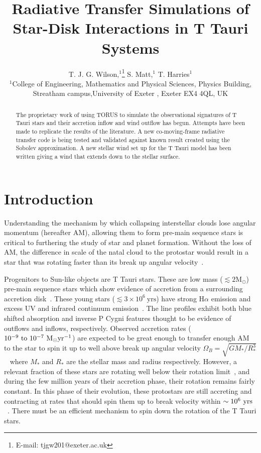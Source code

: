\documentclass[fleqn,usenatbib]{mnras}
\title[Radiative Transfer of Star-Disk Interactions]{Radiative Transfer Simulations of Star-Disk Interactions in T Tauri Systems}
\author[T. J. G. Wilson et al.]{
T. J. G. Wilson,$^{1}$\thanks{E-mail: tjgw201@exeter.ac.uk}
S. Matt,$^{1}$
T. Harries$^{1}$
\\
$^{1}$College of Engineering, Mathematics and Physical Sciences, Physics Building, Streatham campus,University of Exeter , Exeter EX4 4QL, UK\\
}
\begin{document}
\label{firstpage}
\pagerange{\pageref{firstpage}--\pageref{lastpage}}
\maketitle
\begin{abstract}
\noindent The proprietary work of using TORUS to simulate the observational signatures of T Tauri stars and their accretion inflow and wind outflow has begun. Attempts have been made to replicate the results of the literature. A new co-moving-frame radiative transfer code is being tested and validated against known result created using the Sobolev approximation. A new stellar wind set up for the T Tauri model has been written giving a wind that extends down to the stellar surface.
\end{abstract}



\section{Introduction}
\label{sec:introduction}
Understanding the mechanism by which collapsing interstellar clouds lose angular momentum (hereafter AM), allowing them to form pre-main sequence stars is critical to furthering the study of star and planet formation. Without the loss of AM, the difference in scale of the natal cloud to the protostar would result in a star that was rotating faster than its break up angular velocity~\citep{Hartmann:2016gu}. 


Progenitors to Sun-like objects are T Tauri stars. These are low mass ($\lesssim 2 \textrm{M}_\odot$) pre-main sequence stars which show evidence of accretion from a surrounding accretion disk~\citep{1998ApJ...495..385H}. These young stars ($\lesssim3\times10^{6}~\textrm{yrs}$) have strong H$\alpha$ emission and excess UV and infrared continuum emission~\citep{2005MNRAS.358..671K}. The line profiles exhibit both blue shifted absorption and inverse P Cygni features thought to be evidence of outflows and inflows, respectively. Observed accretion rates ($10^{-9}~\textrm{to}~10^{-7}~{\rm M_{\odot} yr^{-1}}$) are expected to be great enough to transfer enough AM to the star to spin it up to well above break up angular velocity $\Omega_B = \sqrt{GM_{*}/R_{*}^3}$~\citep{2005ApJ...632L.135M} where $M_{\ast}$ and $R_{\ast}$ are the stellar mass and radius respectively. However, a relevant fraction of these stars are rotating well below their rotation limit~\citep{1993A&A...272..176B}, and during the few million years of their accretion phase, their rotation remains fairly constant. In this phase of their evolution, these protostars are still accreting and contracting at rates that should spin them up to break velocity within $\sim10^{6}~{\rm yrs}$~\citep{2009A&A...508.1117Z}. There must be an efficient mechanism to spin down the rotation of the T Tauri stars. 
\end{document}
